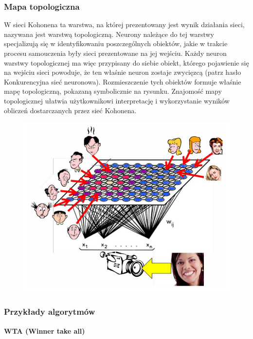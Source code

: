 \documentclass[11pt]{article}
\begin{document}
\hypertarget{mapa-topologiczna}{%
\subsubsection{Mapa topologiczna}\label{mapa-topologiczna}}

W sieci Kohonena ta warstwa, na której prezentowany jest wynik działania
sieci, nazywana jest warstwą topologiczną. Neurony należące do tej
warstwy specjalizują się w identyfikowaniu poszczególnych obiektów,
jakie w trakcie procesu samouczenia były sieci prezentowane na jej
wejściu. Każdy neuron warstwy topologicznej ma więc przypisany do siebie
obiekt, którego pojawienie się na wejściu sieci powoduje, że ten właśnie
neuron zostaje zwycięzcą (patrz hasło Konkurencyjna sieć neuronowa).
Rozmieszczenie tych obiektów formuje właśnie mapę topologiczną, pokazaną
symbolicznie na rysunku. Znajomość mapy topologicznej ułatwia
użytkownikowi interpretację i wykorzystanie wyników obliczeń
dostarczanych przez sieć Kohonena.

\begin{figure}[h!]
  \includegraphics{screeny/topology_map.png}
\end{figure}

\hypertarget{przykux142ady-algorytmuxf3w}{%
\subsubsection{Przykłady algorytmów}\label{przykux142ady-algorytmuxf3w}}

\hypertarget{wta-winner-take-all}{%
\paragraph{WTA (Winner take all)}\label{wta-winner-take-all}}
\end{document}
